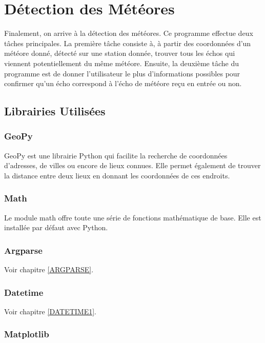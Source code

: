 \documentclass[11pt]{article}
\begin{document}
\newpage

\section{Détection des Météores}

Finalement, on arrive à la détection des météores.
Ce programme effectue deux tâches principales.
La première tâche consiste à, à partir des coordonnées d'un météore donné, détecté sur une station donnée, trouver tous les échos qui viennent potentiellement du même météore.
Ensuite, la deuxième tâche du programme est de donner l'utilisateur le plus d'informations possibles pour confirmer qu'un écho correspond à l'écho de météore reçu en entrée ou non.

\subsection{Librairies Utilisées}

\subsubsection{GeoPy}

GeoPy est une librairie Python qui facilite la recherche de coordonnées d'adresses, de villes ou encore de lieux connues.
Elle permet également de trouver la distance entre deux lieux en donnant les coordonnées de ces endroits.

\subsubsection{Math}

Le module math offre toute une série de fonctions mathématique de base.
Elle est installée par défaut avec Python.

\subsubsection{Argparse}

Voir chapitre \ref{ARGPARSE}.

\subsubsection{Datetime}

Voir chapitre \ref{DATETIME1}.

\subsubsection{Matplotlib}
\end{document}
